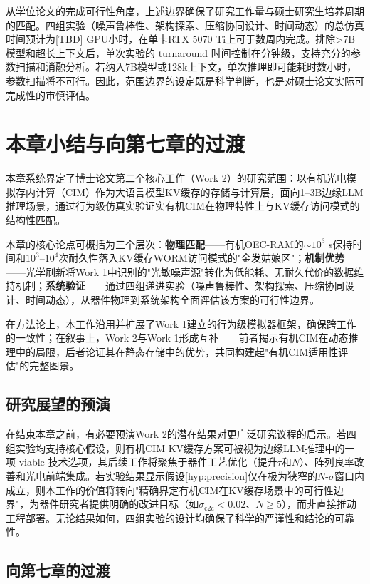 从学位论文的完成可行性角度，上述边界确保了研究工作量与硕士研究生培养周期的匹配。四组实验（噪声鲁棒性、架构探索、压缩协同设计、时间动态）的总仿真时间预计为[TBD] GPU小时，在单卡RTX 5070 Ti上可于数周内完成。排除>7B模型和超长上下文后，单次实验的 turnaround 时间控制在分钟级，支持充分的参数扫描和消融分析。若纳入7B模型或128k上下文，单次推理即可能耗时数小时，参数扫描将不可行。因此，范围边界的设定既是科学判断，也是对硕士论文实际可完成性的审慎评估。


\section{本章小结与向第七章的过渡}
\label{sec:work2_summary}

本章系统界定了博士论文第二个核心工作（Work 2）的研究范围：以有机光电模拟存内计算（CIM）作为大语言模型KV缓存的存储与计算层，面向1–3B边缘LLM推理场景，通过行为级仿真实验证实有机CIM在物理特性上与KV缓存访问模式的结构性匹配。

本章的核心论点可概括为三个层次：\textbf{物理匹配}——有机OEC-RAM的$\sim$$10^3$ s保持时间和$10^3$–$10^4$次耐久性落入KV缓存WORM访问模式的"金发姑娘区"；\textbf{机制优势}——光学刷新将Work 1中识别的"光敏噪声源"转化为低能耗、无耐久代价的数据维持机制；\textbf{系统验证}——通过四组递进实验（噪声鲁棒性、架构探索、压缩协同设计、时间动态），从器件物理到系统架构全面评估该方案的可行性边界。

在方法论上，本工作沿用并扩展了Work 1建立的行为级模拟器框架，确保跨工作的一致性；在叙事上，Work 2与Work 1形成互补——前者揭示有机CIM在动态推理中的局限，后者论证其在静态存储中的优势，共同构建起"有机CIM适用性评估"的完整图景。

\subsection{研究展望的预演}

在结束本章之前，有必要预演Work 2的潜在结果对更广泛研究议程的启示。若四组实验均支持核心假设，则有机CIM KV缓存方案可被视为边缘LLM推理中的一项 viable 技术选项，其后续工作将聚焦于器件工艺优化（提升$\tau$和$N$）、阵列良率改善和光电前端集成。若实验结果显示假设\ref{hyp:precision}仅在极为狭窄的$N$-$\sigma$窗口内成立，则本工作的价值将转向"精确界定有机CIM在KV缓存场景中的可行性边界"，为器件研究者提供明确的改进目标（如$\sigma_{\text{c2c}} < 0.02$、$N \geq 5$），而非直接推动工程部署。无论结果如何，四组实验的设计均确保了科学的严谨性和结论的可靠性。

\subsection{向第七章的过渡}

